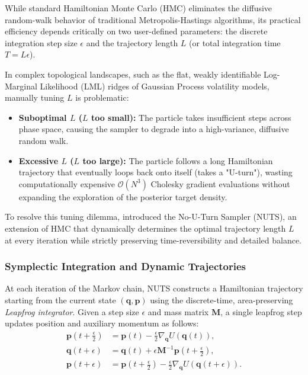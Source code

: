 \documentclass[12pt,oneside]{report}
\theoremstyle{definition}
\theoremstyle{remark}
\begin{document}
While standard Hamiltonian Monte Carlo (HMC) eliminates the diffusive random-walk behavior of traditional Metropolis-Hastings algorithms, its practical efficiency depends critically on two user-defined parameters: the discrete integration step size $\epsilon$ and the trajectory length $L$ (or total integration time $T = L\epsilon$). 

In complex topological landscapes, such as the flat, weakly identifiable Log-Marginal Likelihood (LML) ridges of Gaussian Process volatility models, manually tuning $L$ is problematic:
\begin{itemize}
    \item \textbf{Suboptimal $L$ ($L$ too small):} The particle takes insufficient steps across phase space, causing the sampler to degrade into a high-variance, diffusive random walk.
    \item \textbf{Excessive $L$ ($L$ too large):} The particle follows a long Hamiltonian trajectory that eventually loops back onto itself (takes a "U-turn"), wasting computationally expensive $\mathcal{O}(N^3)$ Cholesky gradient evaluations without expanding the exploration of the posterior target density.
\end{itemize}

To resolve this tuning dilemma, \citet{hoffman2014nuts} introduced the No-U-Turn Sampler (NUTS), an extension of HMC that dynamically determines the optimal trajectory length $L$ at every iteration while strictly preserving time-reversibility and detailed balance.

\subsubsection{Symplectic Integration and Dynamic Trajectories}

At each iteration of the Markov chain, NUTS constructs a Hamiltonian trajectory starting from the current state $(\mathbf{q}, \mathbf{p})$ using the discrete-time, area-preserving \emph{Leapfrog integrator}. Given a step size $\epsilon$ and mass matrix $\mathbf{M}$, a single leapfrog step updates position and auxiliary momentum as follows:
\begin{align}
    \mathbf{p}\left(t + \frac{\epsilon}{2}\right) &= \mathbf{p}(t) - \frac{\epsilon}{2} \nabla_{\mathbf{q}} U(\mathbf{q}(t)), \label{eq:leapfrog1} \\
    \mathbf{q}(t + \epsilon) &= \mathbf{q}(t) + \epsilon \mathbf{M}^{-1} \mathbf{p}\left(t + \frac{\epsilon}{2}\right), \label{eq:leapfrog2} \\
    \mathbf{p}(t + \epsilon) &= \mathbf{p}\left(t + \frac{\epsilon}{2}\right) - \frac{\epsilon}{2} \nabla_{\mathbf{q}} U(\mathbf{q}(t + \epsilon)). \label{eq:leapfrog3}
\end{align}
\end{document}
